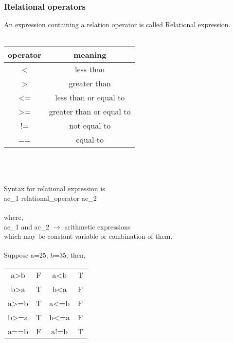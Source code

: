 \documentclass{article}
\begin{document}
	\subsubsection{Relational operators}
	An expression containing a relation operator is called Relational expression.
	\\ \\
	\begin{tabular}{|c|c|}
		\hline
		operator & meaning \\
		\hline
		< & less than \\
		> & greater than \\
		<= & less than or equal to \\
		>= & greater than or equal to \\
		!= & not equal to \\
		== & equal to \\
		\hline
	\end{tabular}
	\\ \\ \\
	Syntax for relational expression is \\
	\tab \tab ae\_1 relational\_operator ae\_2
	\\ \\
	where, \\
	\tab \tab ae\_1 and ae\_2 $\longrightarrow$ arithmetic expressions \\
	which may be constant variable or combination of them.
	\\ \\
	Suppose a=25, b=35; then, \\
	\begin{tabular}{cccc}
		a>b & F & a<b & T \\
		b>a & T & b<a & F \\
		a>=b & T & a<=b & F \\
		b>=a & T & b<=a & F \\
		a==b & F & a!=b & T
	\end{tabular}
	
\end{document}
